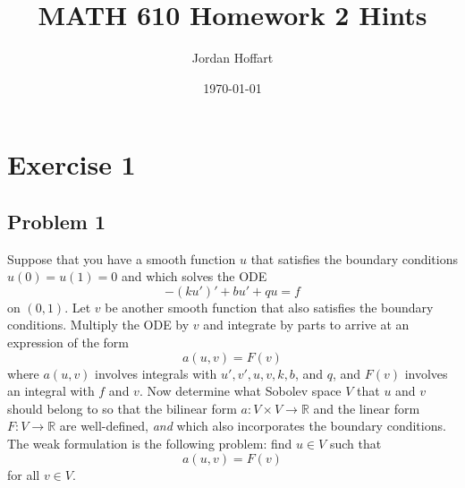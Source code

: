 \documentclass{article}
\title{MATH 610 Homework 2 Hints}
\author{Jordan Hoffart}
\date{\today}
\theoremstyle{definition}
\theoremstyle{plain}
\begin{document}
\maketitle

\section{Exercise 1}

\subsection{Problem 1}
Suppose that you have a smooth function $u$ that satisfies the boundary conditions $u(0) = u(1) = 0$ and which solves the ODE
\begin{equation}
    -(ku')' + bu' + qu = f
\end{equation}
on $(0,1)$.
Let $v$ be another smooth function that also satisfies the boundary conditions.
Multiply the ODE by $v$ and integrate by parts to arrive at an expression of the form
\begin{equation}
    a(u,v) = F(v)
\end{equation}
where $a(u,v)$ involves integrals with $u',v',u,v,k,b$, and $q$, and $F(v)$ involves an integral with $f$ and $v$.
Now determine what Sobolev space $V$ that $u$ and $v$ should belong to so that the bilinear form $a:V\times V \to \mathbb R$ and the linear form $F:V\to\mathbb R$ are well-defined, \emph{and} which also incorporates the boundary conditions.
The weak formulation is the following problem: find $u \in V$ such that 
\begin{equation}
    a(u,v) = F(v)
\end{equation}
for all $v \in V$.
\end{document}
